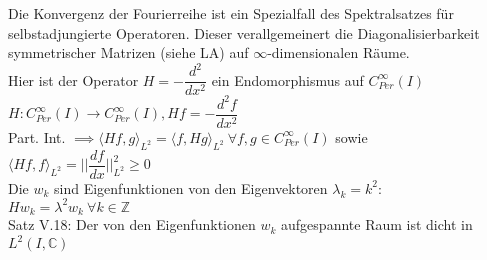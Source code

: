   \begin{remark}
    Die Konvergenz der Fourierreihe ist ein Spezialfall des Spektralsatzes für selbstadjungierte Operatoren. Dieser verallgemeinert die Diagonalisierbarkeit symmetrischer Matrizen (siehe LA) auf $\infty$-dimensionalen Räume.\\
    Hier ist der Operator $H = -\dfrac{d^2}{dx^2}$ ein Endomorphismus auf $C_{Per}^{\infty}(I)$\\
    $H:C_{Per}^{\infty}(I) \to C_{Per}^{\infty}(I), Hf=-\dfrac{d^2f}{dx^2}$\\
    Part. Int. $\implies \langle Hf,g \rangle_{L^2} = \langle f,Hg \rangle_{L^2} \ \forall f,g \in C_{Per}^{\infty}(I)$ sowie $\langle Hf, f \rangle_{L^2} = ||\dfrac{df}{dx}||_{L^2}^2 \geq 0$\\
    Die $w_k$ sind Eigenfunktionen von den Eigenvektoren $\lambda_k = k^2$:\\
    $Hw_k = \lambda^2 w_k \ \forall k \in \mathbb{Z}$\\
    Satz V.18: Der von den Eigenfunktionen $w_k$ aufgespannte Raum ist dicht in $L^2(I, \mathbb{C})$
  \end{remark}

